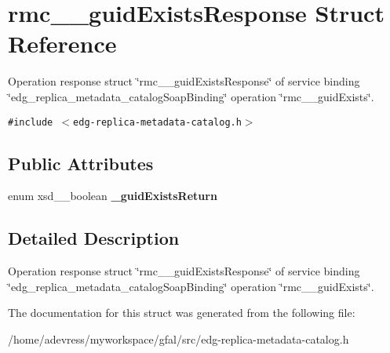 \section{rmc\_\-\_\-guid\-Exists\-Response Struct Reference}
\label{structrmc____guidExistsResponse}
Operation response struct \char`\"{}rmc\_\-\_\-guid\-Exists\-Response\char`\"{} of service binding \char`\"{}edg\_\-replica\_\-metadata\_\-catalog\-Soap\-Binding\char`\"{} operation \char`\"{}rmc\_\-\_\-guid\-Exists\char`\"{}.  


{\tt \#include $<$edg-replica-metadata-catalog.h$>$}

\subsection*{Public Attributes}
\begin{CompactItemize}
\item 
enum xsd\_\-\_\-boolean \textbf{\_\-guid\-Exists\-Return}\label{structrmc____guidExistsResponse_b9076c20c6e3ed1ba63ba2d278d1c0dc}

\end{CompactItemize}


\subsection{Detailed Description}
Operation response struct \char`\"{}rmc\_\-\_\-guid\-Exists\-Response\char`\"{} of service binding \char`\"{}edg\_\-replica\_\-metadata\_\-catalog\-Soap\-Binding\char`\"{} operation \char`\"{}rmc\_\-\_\-guid\-Exists\char`\"{}. 



The documentation for this struct was generated from the following file:\begin{CompactItemize}
\item 
/home/adevress/myworkspace/gfal/src/edg-replica-metadata-catalog.h\end{CompactItemize}

